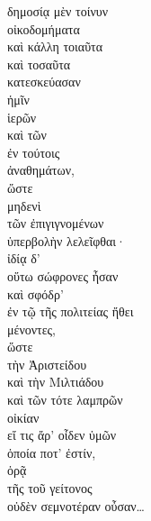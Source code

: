 {\large
\begin{greek}
\noindent δημοσίᾳ μὲν τοίνυν \\
\tabto{2em} οἰκοδομήματα \\
\tabto{4em} καὶ κάλλη τοιαῦτα \\
\tabto{4em} καὶ τοσαῦτα \\
\tabto{2em} κατεσκεύασαν \\
\tabto{4em} ἡμῖν \\
\tabto{4em} ἱερῶν \\
\tabto{4em} καὶ τῶν \\
\tabto{6em} ἐν τούτοις \\
\tabto{4em} ἀναθημάτων, \\
\tabto{6em} ὥστε \\
\tabto{8em} μηδενὶ \\
\tabto{10em} τῶν ἐπιγιγνομένων \\
\tabto{8em} ὑπερβολὴν λελεῖφθαι· \\
ἰδίᾳ δ' \\
\tabto{2em} οὕτω σώφρονες ἦσαν \\
\tabto{2em} καὶ σφόδρ' \\
\tabto{4em} ἐν τῷ τῆς πολιτείας ἤθει \\
\tabto{2em} μένοντες, \\
\tabto{4em} ὥστε \\
\tabto{4em} τὴν Ἀριστείδου \\
\tabto{4em} καὶ τὴν Μιλτιάδου \\
\tabto{4em} καὶ τῶν τότε λαμπρῶν \\
\tabto{4em} οἰκίαν \\
\tabto{6em} εἴ τις ἄρ' οἶδεν ὑμῶν \\
\tabto{8em} ὁποία ποτ' ἐστίν, \\
\tabto{6em} ὁρᾷ \\
\tabto{8em} τῆς τοῦ γείτονος \\
\tabto{6em} οὐδὲν σεμνοτέραν οὖσαν\dots\\

\end{greek}
}

